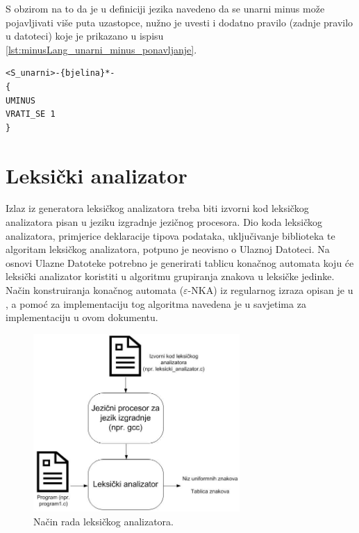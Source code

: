 \documentclass[times, 12pt, utf8]{book}
\begin{document}
S obzirom na to da je u definiciji jezika navedeno da se unarni minus može pojavljivati više puta uzastopce, nužno je uvesti i dodatno pravilo (zadnje pravilo u datoteci) koje je prikazano u ispisu \ref{lst:minusLang_unarni_minus_ponavljanje}.

\begin{lstlisting}[caption={Pravila za detekciju ponavljanja unarnog minusa.},label=lst:minusLang_unarni_minus_ponavljanje]
<S_unarni>-{bjelina}*-
{
UMINUS
VRATI_SE 1
}
\end{lstlisting}

\section{Leksički analizator}\label{sec:leksicki_analizator}
Izlaz iz generatora leksičkog analizatora treba biti izvorni kod leksičkog analizatora pisan u jeziku izgradnje jezičnog procesora.
Dio koda leksičkog analizatora, primjerice deklaracije tipova podataka, uključivanje biblioteka te algoritam leksičkog analizatora, potpuno je neovisno o Ulaznoj Datoteci.
Na osnovi Ulazne Datoteke potrebno je generirati tablicu konačnog automata koju će leksički analizator koristiti u algoritmu grupiranja znakova u leksičke jedinke.
Način konstruiranja konačnog automata (\(\varepsilon\)-NKA) iz regularnog izraza opisan je u \cite[poglavlje 2.2.2]{utr}, a pomoć za implementaciju tog algoritma navedena je u savjetima za implementaciju u ovom dokumentu.

\begin{figure}[htb!]
\centering
\includegraphics[width=0.7\textwidth]{slike/leksicki-analizator.jpg}
\caption{Način rada leksičkog analizatora.}
\label{fig:leksicki-analizator}
\end{figure}
\end{document}
